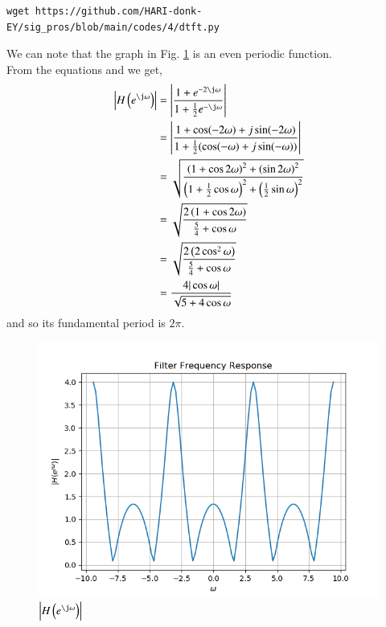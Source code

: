 \documentclass[journal,12pt,twocolumn]{IEEEtran}
\renewcommand\thesection{\arabic{section}}
\begin{document}
\begin{enumerate}[label=\thesection.\arabic*,ref=\thesection.\theenumi]
\begin{lstlisting}
wget https://github.com/HARI-donk-EY/sig_pros/blob/main/codes/4/dtft.py
\end{lstlisting}
We can note that the graph in Fig. \ref{fig:dtft} is an even periodic function.\\
From the equations \label{eq:hzz} and \label{eq:freq_resp} we get,
\begin{align}
\left|H\brak{e^{\j\omega}}\right| &= \left|\frac{1 + e^{-2\j\omega}}{1 + \frac{1}{2}e^{-\j\omega}}\right| \\
&= \left|\frac{1 + \cos(-2\omega) + j\sin(-2\omega)}{1 + \frac{1}{2}(\cos(-\omega) + j\sin(-\omega))}\right|\\
&= \sqrt{\frac{\brak{1 + \cos{2\omega}}^2 + \brak{\sin{2\omega}}^2}{\brak{1 + \frac{1}{2}\cos{\omega}}^2 + \brak{\frac{1}{2}\sin{\omega}}^2}}\\
&= \sqrt{\frac{2\brak{1 + \cos{2\omega}}}{\frac{5}{4} + \cos{\omega}}} \\
&= \sqrt{\frac{2\brak{2\cos^2{\omega}}}{\frac{5}{4} + \cos{\omega}}} \\
&= \frac{4|\cos{\omega}|}{\sqrt{5 + 4\cos{\omega}}}
\end{align}
and so its fundamental period is $2\pi$.\\
\begin{figure}[!ht]
\centering
\includegraphics[width=\columnwidth]{./figs/dtft}
\caption{$\abs{H\brak{e^{\j\omega}}}$}
\label{fig:dtft}
\end{figure}



\end{enumerate}
\end{document}
